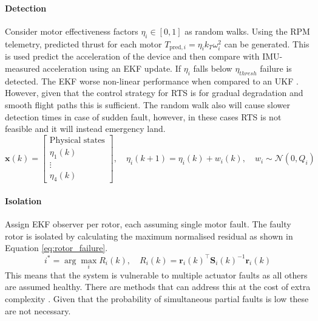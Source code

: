 \paragraph{Detection}
Consider motor effectiveness factors $\eta_i \in [0,1]$ as random walks. Using the \gls{RPM} telemetry, predicted thrust for each motor $T_{\text{pred},i} = \eta_i k_T \omega_i^2$ can be generated. This is used predict the acceleration of the device and then compare with IMU-measured acceleration using an \gls{EKF} update. If $\eta_i$ falls below $\eta_{thresh}$ failure is detected. The \gls{EKF} worse non-linear performance when compared to an \gls{UKF} \cite{WAN2000}. However, given that the control strategy for \gls{RTS} is for gradual degradation and smooth flight paths this is sufficient. The random walk also will cause slower detection times in case of sudden fault, however, in these cases \gls{RTS} is not feasible and it will instead emergency land.
\begin{equation}
    \mathbf{x}(k) = \begin{bmatrix}
        \text{Physical states} \\
        \eta_1(k) \\
        \vdots \\
        \eta_4(k)
    \end{bmatrix}, \quad
    \eta_i(k+1) = \eta_i(k) + w_i(k), \quad w_i \sim \mathcal{N}(0,Q_i)
\end{equation}
\paragraph{Isolation}
Assign \gls{EKF} observer per rotor, each assuming single motor fault. The faulty rotor is isolated by calculating the maximum normalised residual as shown in Equation \ref{eq:rotor_failure}.
\begin{equation}\label{eq:rotor_failure}
    i^* = \arg\max_i R_i(k), \quad R_i(k) = \mathbf{r}_i(k)^\top \mathbf{S}_i(k)^{-1} \mathbf{r}_i(k)
\end{equation}
This means that the system is vulnerable to multiple actuator faults as all others are assumed healthy. There are methods that can address this at the cost of extra complexity \cite{ZHANG2008}. Given that the probability of simultaneous partial faults is low these are not necessary.
